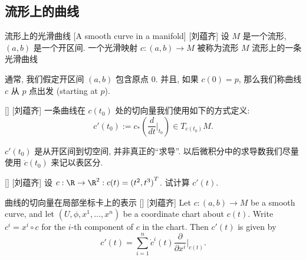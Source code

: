 \documentclass[UTF8]{ctexart}
\begin{document}
    \subsection{流形上的曲线}

        \begin{dfn}
            []
            {流形上的光滑曲线}
            [A smooth curve in a manifold]
            [刘蕴齐]
            设 \(M\) 是一个流形,  \((a,b)\) 是一个开区间. 一个光滑映射 \(c: (a, b) \to M\) 被称为流形 \(M\) 流形上的一条光滑曲线
        \end{dfn}

        \begin{rmk}
            []
            通常, 我们假定开区间 \((a,b)\) 包含原点 \(0\). 并且, 如果 \(c(0) = p\), 那么我们称曲线 \(c\) 从 \(p\) 点出发 (starting at  \(p\)).
        \end{rmk}
        
        \begin{dfn}
            []
            {}
            []
            [刘蕴齐]
            一条曲线在 \(c(t_0)\) 处的切向量我们使用如下的方式定义:
            \[
                c'(t_0):= c_{*}(\frac{d}{dt}|_{t_0}) \in T_{c(t_0)}M.
            \]
        \end{dfn}

        \begin{rmk}
            []
             \(c'(t_0)\) 是从开区间到切空间, 并非真正的“求导”. 以后微积分中的求导数我们尽量使用 \(\dot{c}(t_0)\) 来记以表区分. 
        \end{rmk}

        \begin{xmp}
            []
            {}
            []
            [刘蕴齐]
            设 \(c: \R \to \R^2: c(t) = {(t^2, t^3)}^T\). 试计算 \(c'(t)\). 
        \end{xmp}

        \begin{ppt}
            []
            {曲线的切向量在局部坐标卡上的表示}
            []
            [刘蕴齐]
            Let \( c: (a,b) \to M \) be a smooth curve, 
            and let \( (U, \phi, x^1, \dots, x^n) \) be a coordinate chart about \( c(t) \). 
            Write \( c^i = x^i \circ c \) for the \( i \)-th component of \( c \) in the chart. Then \( c'(t) \) is given by
            \[
            c'(t) = \sum_{i=1}^{n} \dot{c}^i(t) \frac{\partial}{\partial x^i} \bigg|_{c(t)}.
            \]
        \end{ppt}
    
\end{document}
